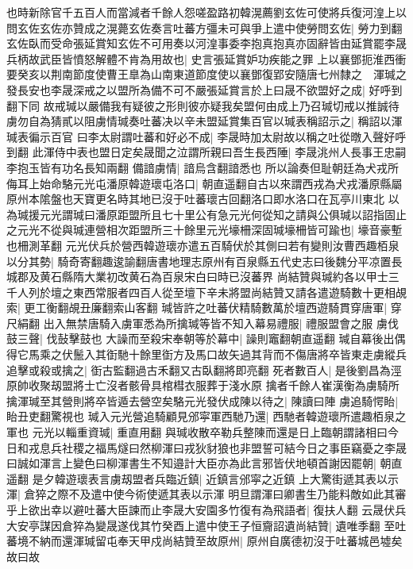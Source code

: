 也時新除官千五百人而當減者千餘人怨嗟盈路初韓滉薦劉玄佐可使將兵復河湟上以問玄佐玄佐亦贊成之滉薨玄佐奏言吐蕃方彊未可與爭上遣中使勞問玄佐|{
	勞力到翻}
玄佐臥而受命張延賞知玄佐不可用奏以河湟事委李抱真抱真亦固辭皆由延賞罷李晟兵柄故武臣皆憤怒解體不肯為用故也|{
	史言張延賞妒功疾能之罪}
上以襄鄧扼淮西衝要癸亥以荆南節度使曹王臯為山南東道節度使以襄鄧復郢安隨唐七州隸之　渾瑊之發長安也李晟深戒之以盟所為備不可不嚴張延賞言於上曰晟不欲盟好之成|{
	好呼到翻下同}
故戒瑊以嚴備我有疑彼之形則彼亦疑我矣盟何由成上乃召瑊切戒以推誠待虜勿自為猜貳以阻虜情瑊奏吐蕃决以辛未盟延賞集百官以瑊表稱詔示之|{
	稱詔以渾瑊表徧示百官}
曰李太尉謂吐蕃和好必不成|{
	李晟時加太尉故以稱之吐從暾入聲好呼到翻}
此渾侍中表也盟日定矣晟聞之泣謂所親曰吾生長西陲|{
	李晟洮州人長事王忠嗣李抱玉皆有功名長知兩翻}
備諳虜情|{
	諳烏含翻諳悉也}
所以論奏但耻朝廷為犬戎所侮耳上始命駱元光屯潘原韓遊瓌屯洛口|{
	朝直遥翻自古以來謂西戎為犬戎潘原縣屬原州本隂盤也天寶更名時其地已沒于吐蕃瓌古回翻洛口即水洛口在瓦亭川東北}
以為瑊援元光謂瑊曰潘原距盟所且七十里公有急元光何從知之請與公俱瑊以詔指固止之元光不從與瑊連營相次距盟所三十餘里元光壕柵深固瑊壕柵皆可踰也|{
	壕音豪塹也柵測革翻}
元光伏兵於營西韓遊瓌亦遣五百騎伏於其側曰若有變則汝曹西趣栢泉以分其勢|{
	騎奇寄翻趣逡諭翻唐書地理志原州有百泉縣五代史志曰後魏分平凉置長城郡及黄石縣隋大業初改黄石為百泉宋白曰時已沒蕃界}
尚結贊與瑊約各以甲士三千人列於壇之東西常服者四百人從至壇下辛未將盟尚結贊又請各遣遊騎數十更相覘索|{
	更工衡翻覘丑廉翻索山客翻}
瑊皆許之吐蕃伏精騎數萬於壇西遊騎貫穿唐軍|{
	穿尺絹翻}
出入無禁唐騎入虜軍悉為所擒瑊等皆不知入幕易禮服|{
	禮服盟會之服}
虜伐鼓三聲|{
	伐鼔擊鼓也}
大譟而至殺宋奉朝等於幕中|{
	譟則竈翻朝直遥翻}
瑊自幕後出偶得它馬乘之伏鬛入其衘馳十餘里衘方及馬口故矢過其背而不傷唐將卒皆東走虜縱兵追擊或殺或擒之|{
	衘古監翻過古禾翻又古臥翻將即亮翻}
死者數百人|{
	是後劉昌為涇原帥收聚刼盟將士亡沒者骸骨具棺槥衣服葬于淺水原}
擒者千餘人崔漢衡為虜騎所擒渾瑊至其營則將卒皆遁去營空矣駱元光發伏成陳以待之|{
	陳讀曰陣}
虜追騎愕眙|{
	眙丑吏翻驚視也}
瑊入元光營追騎顧見邠寜軍西馳乃還|{
	西馳者韓遊瓌所遣趣栢泉之軍也}
元光以輜重資瑊|{
	重直用翻}
與瑊收散卒勒兵整陳而還是日上臨朝謂諸相曰今日和戎息兵社稷之福馬燧曰然柳渾曰戎狄豺狼也非盟誓可結今日之事臣竊憂之李晟曰誠如渾言上變色曰柳渾書生不知邉計大臣亦為此言邪皆伏地頓首謝因罷朝|{
	朝直遥翻}
是夕韓遊瓌表言虜刼盟者兵臨近鎮|{
	近鎮言邠寜之近鎮}
上大驚街遞其表以示渾|{
	倉猝之際不及遣中使今術使遞其表以示渾}
明旦謂渾曰卿書生乃能料敵如此其審乎上欲出幸以避吐蕃大臣諫而止李晟大安園多竹復有為飛語者|{
	復扶人翻}
云晟伏兵大安亭謀因倉猝為變晟遂伐其竹癸酉上遣中使王子恒齎詔遺尚結贊|{
	遺唯季翻}
至吐蕃境不納而還渾瑊留屯奉天甲戍尚結贊至故原州|{
	原州自廣德初沒于吐蕃城邑墟矣故曰故}
